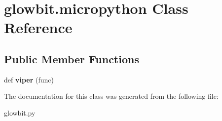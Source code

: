 \hypertarget{classglowbit_1_1micropython}{}\section{glowbit.\+micropython Class Reference}
\label{classglowbit_1_1micropython}
\subsection*{Public Member Functions}
\begin{DoxyCompactItemize}
\item 
\mbox{\label{classglowbit_1_1micropython_a37370a837bfad970b380b72a9071b1b5}} 
def {\bfseries viper} (func)
\end{DoxyCompactItemize}


The documentation for this class was generated from the following file\+:\begin{DoxyCompactItemize}
\item 
glowbit.\+py\end{DoxyCompactItemize}
